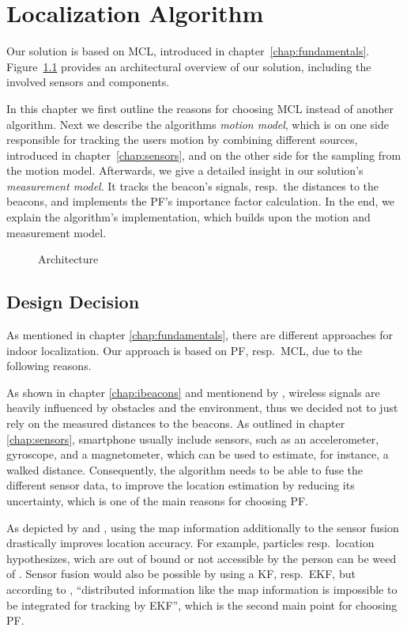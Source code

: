 \chapter{Localization Algorithm} \label{chap:pf}
Our solution is based on \acl{MCL}, introduced in chapter~\ref{chap:fundamentals}. Figure~\ref{fig:algo_architecture} provides an architectural overview of our solution, including the involved sensors and components.

In this chapter we first outline the reasons for choosing \acs{MCL} instead of another algorithm. Next we describe the algorithms \emph{motion model}, which is on one side responsible for tracking the users motion by combining different sources, introduced in chapter~\ref{chap:sensors}, and on the other side for the sampling from the motion model. Afterwards, we give a detailed insight in our solution's \emph{measurement model}. It tracks the beacon's signals, resp.\ the distances to the beacons, and implements the \acs{PF}'s importance factor calculation. In the end, we explain the algorithm's implementation, which builds upon the motion and measurement model.

\begin{figure}
\def\svgwidth{0.9\textwidth}

\caption{Architecture}
\label{fig:algo_architecture}
\end{figure}


\section{Design Decision}
As mentioned in chapter \ref{chap:fundamentals}, there are different approaches for indoor localization. Our approach is based on \acl{PF}, resp.\ \acl{MCL}, due to the following reasons.

As shown in chapter \ref{chap:ibeacons} and mentionend by \citet{IEEE:survey_wireless_indoor_pos}, wireless signals are heavily influenced by obstacles and the environment, thus we decided not to just rely on the measured distances to the beacons. As outlined in chapter \ref{chap:sensors}, smartphone usually include sensors, such as an accelerometer, gyroscope, and a magnetometer, which can be used to estimate, for instance, a walked distance. Consequently, the algorithm needs to be able to fuse the different sensor data, to improve the location estimation by reducing its uncertainty, which is one of the main reasons for choosing \acs{PF}.

As depicted by \citet{siddiqi:experiments_mcl_wifi} and \citet{wang:wlan}, using the map information additionally to the sensor fusion drastically improves location accuracy. For example, particles resp.\ location hypothesizes, wich are out of bound or not accessible by the person can be weed of \citep{straub:pf,siddiqi:experiments_mcl_wifi}. Sensor fusion would also be possible by using a \acl{KF}, resp.\ \acs{EKF}, but according to \citet{wang:wlan}, ``distributed information like the map information is impossible to be integrated for tracking by \acs{EKF}'', which is the second main point for choosing \acs{PF}.

